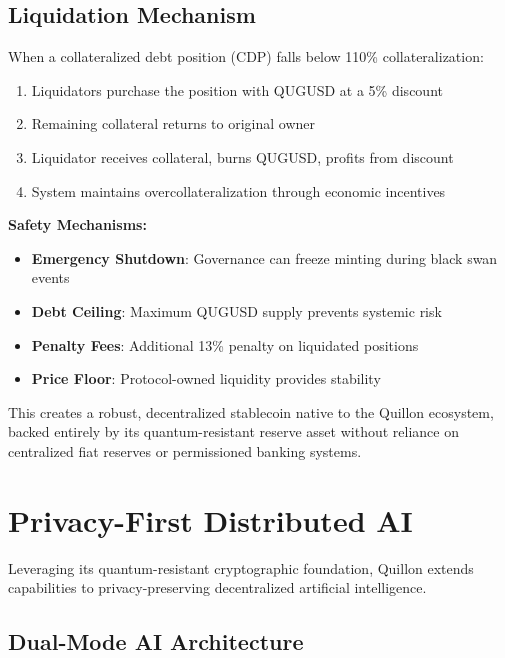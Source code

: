 \documentclass[11pt,a4paper]{scrartcl}
\begin{document}
\subsection{Liquidation Mechanism}

When a collateralized debt position (CDP) falls below 110\% collateralization:

\begin{enumerate}
\item Liquidators purchase the position with QUGUSD at a 5\% discount
\item Remaining collateral returns to original owner
\item Liquidator receives collateral, burns QUGUSD, profits from discount
\item System maintains overcollateralization through economic incentives
\end{enumerate}

\textbf{Safety Mechanisms:}

\begin{itemize}
\item \textbf{Emergency Shutdown}: Governance can freeze minting during black swan events
\item \textbf{Debt Ceiling}: Maximum QUGUSD supply prevents systemic risk
\item \textbf{Penalty Fees}: Additional 13\% penalty on liquidated positions
\item \textbf{Price Floor}: Protocol-owned liquidity provides stability
\end{itemize}

This creates a robust, decentralized stablecoin native to the Quillon ecosystem, backed entirely by its quantum-resistant reserve asset without reliance on centralized fiat reserves or permissioned banking systems.

\newpage

\section{Privacy-First Distributed AI}

Leveraging its quantum-resistant cryptographic foundation, Quillon extends capabilities to privacy-preserving decentralized artificial intelligence.

\subsection{Dual-Mode AI Architecture}
\end{document}
